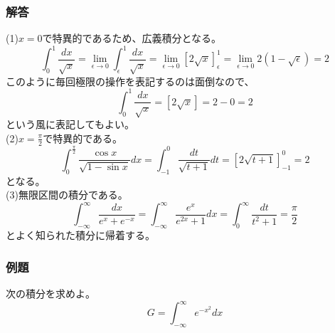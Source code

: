 \documentclass[a4j,dvipdfmx]{jsarticle}
\begin{document}
\subsubsection*{解答}
(1)$x=0$で特異的であるため、広義積分となる。
\begin{equation*}
    \int_0^1\frac{dx}{\sqrt{x}}=\lim_{\epsilon\to 0}\int_{\epsilon}^1\frac{dx}{\sqrt{x}}=\lim_{\epsilon\to 0}\left[2\sqrt{x}\right]_\epsilon^1=\lim_{\epsilon\to 0}2(1-\sqrt{\epsilon})=2
\end{equation*}
このように毎回極限の操作を表記するのは面倒なので、
\begin{equation*}
    \int_0^1\frac{dx}{\sqrt{x}}=\left[2\sqrt{x}\right]=2-0=2
\end{equation*}
という風に表記してもよい。\\

(2)$x=\frac{\pi}{2}$で特異的である。
\begin{equation*}
    \int_0^\frac{\pi}{2}\frac{\cos x}{\sqrt{1-\sin x}}dx=\int_{-1}^0 \frac{dt}{\sqrt{t+1}}dt=\left[2\sqrt{t+1}\right]_{-1}^0=2
\end{equation*}
となる。\\

(3)無限区間の積分である。
\begin{equation*}
    \int_{-\infty}^\infty \frac{dx}{e^x+e^{-x}}=\int_{-\infty}^\infty \frac{e^x}{e^{2x}+1}dx=\int_0^\infty \frac{dt}{t^2+1}=\frac{\pi}{2}
\end{equation*}
とよく知られた積分に帰着する。
\newpage
\subsubsection*{例題}
次の積分を求めよ。
\begin{equation*}
    G=\int_{-\infty}^{\infty}e^{-x^2}dx
\end{equation*}
\end{document}

